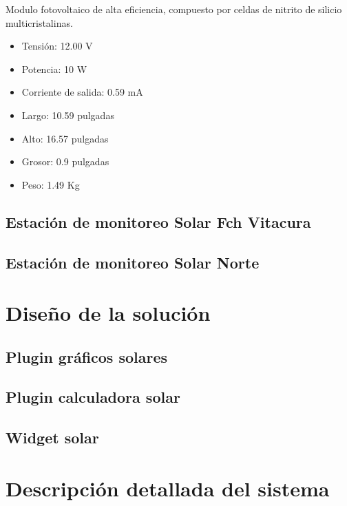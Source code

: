 Modulo fotovoltaico de alta eficiencia, compuesto por celdas de nitrito de silicio multicristalinas.
\begin{itemize}
\item Tensión: 12.00 V
\item Potencia: 10 W
\item Corriente de salida: 0.59 mA
\item Largo: 10.59 pulgadas
\item Alto: 16.57 pulgadas
\item Grosor: 0.9 pulgadas
\item Peso: 1.49 Kg 
\end{itemize}

\subsection{Estación de monitoreo Solar Fch Vitacura}
\subsection{Estación de monitoreo Solar Norte}

\section{Diseño de la solución}
\subsection{Plugin gráficos solares}
\subsection{Plugin calculadora solar}
\subsection{Widget solar}

\section{Descripción detallada del sistema}


